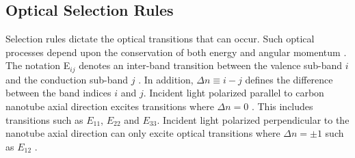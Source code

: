 \subsection{Optical Selection Rules}

Selection rules dictate the optical transitions that can occur. Such optical processes depend upon the conservation of both energy and angular momentum \cite{weismanKonoBook}. The notation E$_{ij}$ denotes an inter-band transition between the valence sub-band $i$ and the conduction sub-band $j$ \cite{weismanKonoBook}. In addition, $\Delta n \equiv i - j$ defines the difference between the band indices $i$ and $j$.  Incident light polarized parallel to carbon nanotube axial direction excites transitions where $\Delta n = 0$ \cite{weismanKonoBook}. This includes transitions such as $E_{11}$, $E_{22}$ and $E_{33}$. Incident light polarized perpendicular to the nanotube axial direction can only excite optical transitions where $\Delta n = \pm 1$ such as $E_{12}$ \cite{weismanKonoBook}. 


